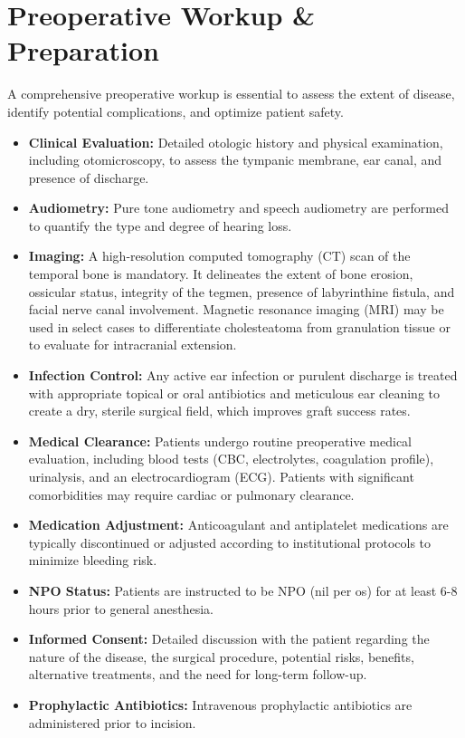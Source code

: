 \section*{Preoperative Workup \& Preparation}
A comprehensive preoperative workup is essential to assess the extent of disease, identify potential complications, and optimize patient safety.

\begin{itemize}
  \item \textbf{Clinical Evaluation:} Detailed otologic history and physical examination, including otomicroscopy, to assess the tympanic membrane, ear canal, and presence of discharge.
  
  \item \textbf{Audiometry:} Pure tone audiometry and speech audiometry are performed to quantify the type and degree of hearing loss.
  
  \item \textbf{Imaging:} A high-resolution computed tomography (CT) scan of the temporal bone is mandatory. It delineates the extent of bone erosion, ossicular status, integrity of the tegmen, presence of labyrinthine fistula, and facial nerve canal involvement. Magnetic resonance imaging (MRI) may be used in select cases to differentiate cholesteatoma from granulation tissue or to evaluate for intracranial extension.
  
  \item \textbf{Infection Control:} Any active ear infection or purulent discharge is treated with appropriate topical or oral antibiotics and meticulous ear cleaning to create a dry, sterile surgical field, which improves graft success rates.
  
  \item \textbf{Medical Clearance:} Patients undergo routine preoperative medical evaluation, including blood tests (CBC, electrolytes, coagulation profile), urinalysis, and an electrocardiogram (ECG). Patients with significant comorbidities may require cardiac or pulmonary clearance.
  
  \item \textbf{Medication Adjustment:} Anticoagulant and antiplatelet medications are typically discontinued or adjusted according to institutional protocols to minimize bleeding risk.
  
  \item \textbf{NPO Status:} Patients are instructed to be NPO (nil per os) for at least 6-8 hours prior to general anesthesia.
  
  \item \textbf{Informed Consent:} Detailed discussion with the patient regarding the nature of the disease, the surgical procedure, potential risks, benefits, alternative treatments, and the need for long-term follow-up.
  
  \item \textbf{Prophylactic Antibiotics:} Intravenous prophylactic antibiotics are administered prior to incision.
\end{itemize}

